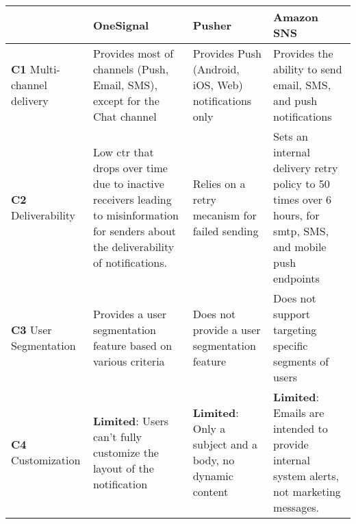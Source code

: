 \begin{table}[hbt!]
      \centering
      \begin{tabularx}{\textwidth}{ |
                  >{\raggedright\arraybackslash} X |
                  >{\raggedright\arraybackslash} X |
                  >{\raggedright\arraybackslash} X |
                  >{\raggedright\arraybackslash} X |
            }
            \hline
                                                          & \textbf{OneSignal}                                                                                                                                & \textbf{Pusher}                                                                & \textbf{Amazon SNS}                                                                                                 \\
            \hline
            \textbf{C1} \linebreak Multi-channel delivery & Provides most of channels (Push, Email, SMS), except for the Chat channel                                                                         & Provides Push (Android, iOS, Web) notifications only                           & Provides the ability to send email, SMS, and push notifications                                                     \\
            \hline
            \textbf{C2} \linebreak Deliverability         & Low \acrfull{ctr} that drops over time due to inactive receivers leading to misinformation for senders about the deliverability of notifications. & Relies on a retry mecanism for failed sending                                  & Sets an internal delivery retry policy to 50 times over 6 hours, for \acrfull{smtp}, SMS, and mobile push endpoints \\
            \hline
            \textbf{C3} \linebreak User Segmentation      & Provides a user segmentation feature based on various criteria                                                                                    & Does not provide a user segmentation feature                                   & Does not support targeting specific segments of users                                                               \\
            \hline
            \textbf{C4} \linebreak Customization          & \textbf{Limited}: Users can’t fully customize the layout of the notification                                                                      & \textbf{Limited}: Only a subject and a body, no dynamic content                & \textbf{Limited}: Emails are intended to provide internal system alerts, not marketing messages.                    \\

\end{tabularx}
\end{table}

